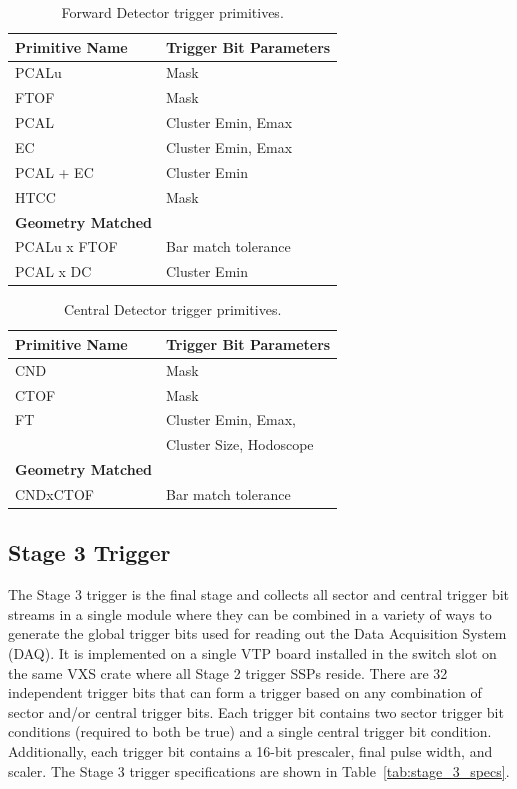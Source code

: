 \begin{table}
\begin{center}
	\begin{tabular}{| l | l |}
		\hline \hline
		Primitive Name			& Trigger Bit Parameters	\\
		\hline
		PCALu     			& Mask				\\
		FTOF    			& Mask				\\
		PCAL				& Cluster Emin, Emax		\\
		EC 				& Cluster Emin, Emax		\\
		PCAL + EC			& Cluster Emin			\\
		HTCC				& Mask				\\
		{\bf Geometry Matched}		&				\\
		PCALu x FTOF			& Bar match tolerance		\\
		PCAL x DC				& Cluster Emin			\\
		\hline \hline
	\end{tabular}
\end{center}
\caption{Forward Detector trigger primitives.}
\label{tab:fd_trig_primitives}
\end{table}

\begin{table}
\begin{center}
	\begin{tabular}{| l | l |}
		\hline \hline
		Primitive Name			& Trigger Bit Parameters	\\
		\hline
		CND     			& Mask				\\
		CTOF    			& Mask				\\
		FT				& Cluster Emin, Emax, 		\\
						& Cluster Size, Hodoscope	\\
		{\bf Geometry Matched}		&				\\
		CNDxCTOF			& Bar match tolerance		\\
		\hline \hline
	\end{tabular}
\end{center}
\caption{Central Detector trigger primitives.}
\label{tab:cd_trig_primitives}
\end{table}


\subsection{Stage 3 Trigger}

The Stage 3 trigger is the final stage and collects all sector and central trigger bit streams in a single module where they can be combined in a variety of ways to generate the global trigger bits used for reading out the Data Acquisition System (DAQ). It is implemented on a single VTP board installed in the switch slot on the same VXS crate where all Stage 2 trigger SSPs reside. There are 32 independent trigger bits that can form a trigger based on any combination of sector and/or central trigger bits. Each trigger bit contains two sector trigger bit conditions (required to both be true) and a single central trigger bit condition. Additionally, each trigger bit contains a 16-bit prescaler, final pulse width, and scaler. The Stage 3 trigger specifications are shown in Table~\ref{tab:stage_3_specs}.

